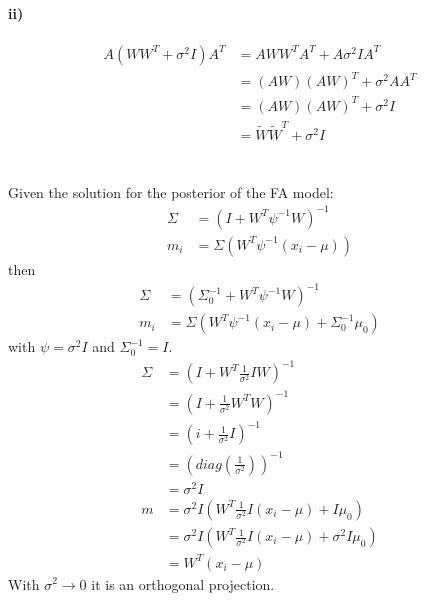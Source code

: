 \documentclass[11pt]{article}
\newcommand{\exercise}{\section{}}
\begin{document}
\paragraph{ii)}
\begin{align*}
	A(WW^T + \sigma^2I)A^T &= AWW^TA^T + A\sigma^2IA^T \\
	&= (AW)(AW)^T + \sigma^2 AA^T \\
	&= (AW)(AW)^T + \sigma^2I \\
	&=  \widetilde{W}\widetilde{W}^T + \sigma^2I
\end{align*}
\exercise
Given the solution for the posterior of the FA model: 
\begin{align*}
	\Sigma &= (I + W^T\psi^{-1}W)^{-1} \\
	m_i &= \Sigma(W^T\psi^{-1}(x_i - \mu))
\end{align*}
then
\begin{align*}
	\Sigma &=(\Sigma_0^{-1}+W^T\psi^{-1}W)^{-1} \\
	m_i &= \Sigma(W^T\psi^{-1}(x_i - \mu)+\Sigma_0^{-1}\mu_0)
\end{align*}
with $\psi= \sigma^2I$ and $\Sigma_0^{-1} = I$.
\begin{align*}
	\Sigma &= (I + W^T\frac{1}{\sigma^2}IW)^{-1} \\
	&= (I + \frac{1}{\sigma^2}W^TW)^{-1} \\
	&= (i + \frac{1}{\sigma^2}I)^{-1} \\
	&= (diag(\frac{1}{\sigma^2}))^{-1} \\
	&= \sigma^2I \\
	m &= \sigma^2I(W^T\frac{1}{\sigma^2}I(x_i - \mu) + I\mu_0) \\
	&= \sigma^2I(W^T\frac{1}{\sigma^2}I(x_i - \mu) + \sigma^2I\mu_0) \\
	&= W^T(x_i-\mu)
\end{align*}
With $\sigma^2 \rightarrow 0$ it is an orthogonal projection.
\end{document}
